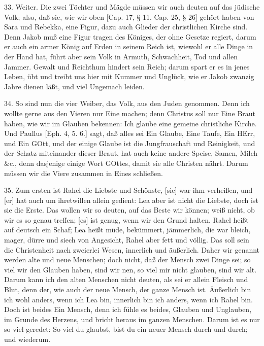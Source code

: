 33. Weiter. Die zwei Töchter und Mägde müssen wir auch deuten auf das jüdische Volk; also, daß sie, wie wir oben [Cap. 17, § 11. Cap. 25, § 26] gehört haben von Sara und Rebekka, eine Figur, dazu auch Glieder der christlichen Kirche sind. Denn Jakob muß eine Figur tragen des Königes, der ohne Gesetze regiert, darum er auch ein armer König auf Erden in seinem Reich ist, wiewohl er alle Dinge in der Hand hat, führt aber sein Volk in Armuth, Schwachheit, Tod und allen Jammer. Gewalt und Reichthum hindert sein Reich; darum spart er es in jenes Leben, übt und treibt uns hier mit Kummer und Unglück, wie er Jakob zwanzig Jahre dienen läßt, und viel Ungemach leiden.

34. So sind nun die vier Weiber, das Volk, aus den Juden genommen. Denn ich wollte gerne aus den Vieren nur Eine machen; denn Christus soll nur Eine Braut haben, wie wir im Glauben bekennen: Ich glaube eine gemeine christliche Kirche. Und Paullus [Eph. 4, 5. 6.] sagt, daß alles sei Ein Glaube, Eine Taufe, Ein HErr, und Ein GOtt, und der einige Glaube ist die Jungfrauschaft und Reinigkeit, und der Schatz miteinander dieser Braut, hat auch keine andere Speise, Samen, Milch \&c., denn dasjenige einige Wort GOttes, damit sie alle Christen nährt. Darum müssen wir die Viere zusammen in Eines schließen.

35. Zum ersten ist Rahel die Liebste und Schönste, [sie] war ihm verheißen, und [er] hat auch um ihretwillen allein gedient: Lea aber ist nicht die Liebste, doch ist sie die Erste. Das wollen wir so deuten, auf das Beste wir können; weiß nicht, ob wir es so genau treffen; [es] ist genug, wenn wir den Grund halten. Rahel heißt auf deutsch ein Schaf; Lea heißt müde, bekümmert, jämmerlich, die war bleich, mager, dürre und siech von Angesicht, Rahel aber fett und völlig. Das soll sein die Christenheit nach zweierlei Wesen, innerlich und äußerlich. Daher wir genannt werden alte und neue Menschen; doch nicht, daß der Mensch zwei Dinge sei; so viel wir den Glauben haben, sind wir
nen, so viel mir nicht glauben, sind wir alt. Darum kann ich den alten Menschen nicht deuten, als sei er allein Fleisch und Blut, denn der, wie auch der neue Mensch, der ganze Mensch ist. Äußerlich bin ich wohl anders, wenn ich Lea bin, innerlich bin ich anders, wenn ich Rahel bin. Doch ist beides Ein Mensch, denn ich fühle es beides, Glauben und Unglauben, im Grunde des Herzens, und bricht heraus im ganzen Menschen. Darum ist es nur so viel geredet: So viel du glaubst, bist du ein neuer Mensch durch und durch; und wiederum.

